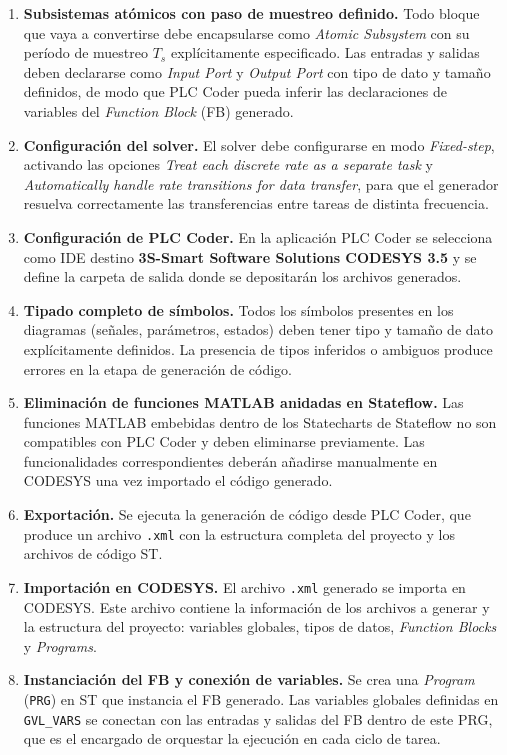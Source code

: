 \documentclass[12pt, a4paper]{article}
\begin{document}
\begin{enumerate}

    \item \textbf{Subsistemas atómicos con paso de muestreo definido.}
    Todo bloque que vaya a convertirse debe encapsularse como \textit{Atomic Subsystem}
    con su período de muestreo $T_s$ explícitamente especificado. Las entradas y salidas
    deben declararse como \textit{Input Port} y \textit{Output Port} con tipo de dato y
    tamaño definidos, de modo que PLC Coder pueda inferir las declaraciones de variables
    del \textit{Function Block} (FB) generado.

    \item \textbf{Configuración del solver.}
    El solver debe configurarse en modo \textit{Fixed-step}, activando las opciones
    \textit{Treat each discrete rate as a separate task} y \textit{Automatically handle
    rate transitions for data transfer}, para que el generador resuelva correctamente
    las transferencias entre tareas de distinta frecuencia.

    \item \textbf{Configuración de PLC Coder.}
    En la aplicación PLC Coder se selecciona como IDE destino \textbf{3S-Smart Software
    Solutions CODESYS 3.5} y se define la carpeta de salida donde se depositarán los
    archivos generados.

    \item \textbf{Tipado completo de símbolos.}
    Todos los símbolos presentes en los diagramas (señales, parámetros, estados)
    deben tener tipo y tamaño de dato explícitamente definidos. La presencia de tipos
    inferidos o ambiguos produce errores en la etapa de generación de código.

    \item \textbf{Eliminación de funciones MATLAB anidadas en Stateflow.}
    Las funciones MATLAB embebidas dentro de los Statecharts de Stateflow no son
    compatibles con PLC Coder y deben eliminarse previamente. Las funcionalidades
    correspondientes deberán añadirse manualmente en CODESYS una vez importado el
    código generado.

    \item \textbf{Exportación.}
    Se ejecuta la generación de código desde PLC Coder, que produce un archivo
    \texttt{.xml} con la estructura completa del proyecto y los archivos de código ST.

    \item \textbf{Importación en CODESYS.}
    El archivo \texttt{.xml} generado se importa en CODESYS. Este archivo contiene
    la información de los archivos a generar y la estructura del proyecto: variables
    globales, tipos de datos, \textit{Function Blocks} y \textit{Programs}.

    \item \textbf{Instanciación del FB y conexión de variables.}
    Se crea una \textit{Program} (\texttt{PRG}) en ST que instancia el FB generado.
    Las variables globales definidas en \texttt{GVL\_VARS} se conectan con las
    entradas y salidas del FB dentro de este PRG, que es el encargado de orquestar
    la ejecución en cada ciclo de tarea.

\end{enumerate}
\end{document}
